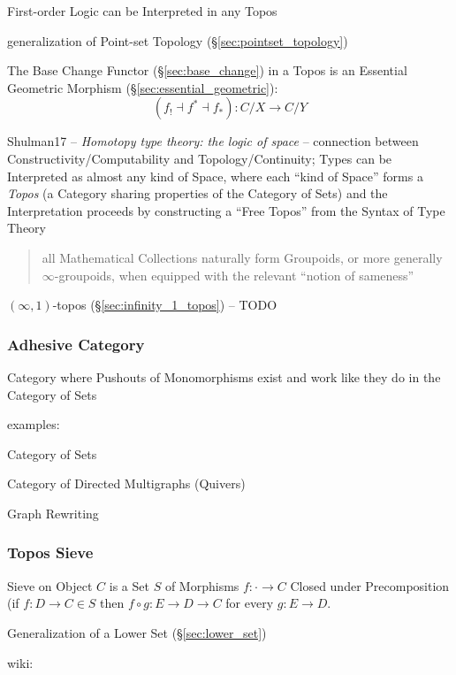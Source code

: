 First-order Logic can be Interpreted in any Topos

generalization of Point-set Topology (\S\ref{sec:pointset_topology})

The Base Change Functor (\S\ref{sec:base_change}) in a Topos is an
Essential Geometric Morphism (\S\ref{sec:essential_geometric}):
\[
  (f_! \dashv f^* \dashv f_*):C/X \rightarrow C/Y
\]


Shulman17 -- \emph{Homotopy type theory: the logic of space} --
connection between Constructivity/Computability and Topology/Continuity; Types
can be Interpreted as almost any kind of Space, where each ``kind of Space''
forms a \emph{Topos} (a Category sharing properties of the Category of Sets) and
the Interpretation proceeds by constructing a ``Free Topos'' from the Syntax of
Type Theory
\begin{quote}
all Mathematical Collections naturally form Groupoids, or more
generally $\infty$-groupoids, when equipped with the relevant ``notion
of sameness''
\end{quote}


\fist $(\infty,1)$-topos (\S\ref{sec:infinity_1_topos}) -- TODO



\subsubsection{Adhesive Category}\label{sec:adhesive_category}

Category where Pushouts of Monomorphisms exist and work like they do in the
Category of Sets

examples:

Category of Sets

Category of Directed Multigraphs (Quivers)

Graph Rewriting %



\subsubsection{Topos Sieve}\label{sec:topos_sieve}

Sieve on Object $C$ is a Set $S$ of Morphisms $f : \cdot \rightarrow
C$ Closed under Precomposition (if $f : D \rightarrow C \in S$ then $f
\circ g : E \rightarrow D \rightarrow C$ for every $g : E \rightarrow
D$.

Generalization of a Lower Set (\S\ref{sec:lower_set})

wiki:

